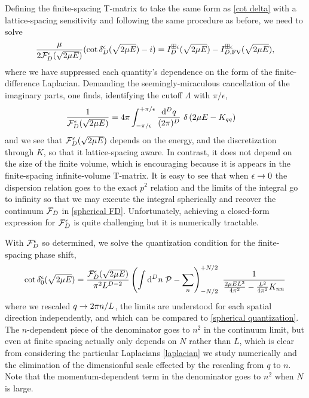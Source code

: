 Defining the finite-spacing T-matrix to take the same form as \eqref{cot delta} with a lattice-spacing sensitivity and following the same procedure as before, we need to solve
\begin{equation}
    \frac{\mu}{2\mathcal{F}_D^\epsilon(\sqrt{2 \mu E})}(\cot \delta_D^\epsilon(\sqrt{2 \mu E}) - i) = I_D^{\boxplus \epsilon}(\sqrt{2 \mu E}) - I_{D,\textrm{FV}}^{\boxplus \epsilon}(\sqrt{2 \mu E}),
\end{equation}
where we have suppressed each quantity's dependence on the form of the finite-difference Laplacian.
Demanding the seemingly-miraculous cancellation of the imaginary parts, one finds, identifying the cutoff $\Lambda$ with $\pi/\epsilon$,
\begin{align}
    \frac{1}{\mathcal{F}_D^\epsilon(\sqrt{2 \mu E})} &= 4\pi \int_{-\pi/\epsilon}^{+\pi/\epsilon} \frac{\mathrm{d}^D q}{(2\pi)^D}\
    \delta\left(2\mu E - K_{qq}\right)
\end{align}
and we see that $\mathcal{F}_D^\epsilon(\sqrt{2 \mu E})$ depends on the energy, and the discretization through $K$, so that it lattice-spacing aware.
In contrast, it does not depend on the size of the finite volume, which is encouraging because it is appears in the finite-spacing infinite-volume T-matrix.
It is easy to see that when $\epsilon\rightarrow0$ the dispersion relation goes to the exact $p^2$ relation and the limits of the integral go to infinity so that we may execute the integral spherically and recover the continuum $\mathcal{F}_D$ in \eqref{spherical FD}.
Unfortunately, achieving a closed-form expression for $\mathcal{F}_D^\epsilon$ is quite challenging but it is numerically tractable.

With $\mathcal{F}_D^\epsilon$ so determined, we solve the quantization condition for the finite-spacing phase shift,
\begin{align}
    \cot \delta_0^\epsilon(\sqrt{2 \mu E})
    =
    \frac{\mathcal{F}_D^\epsilon(\sqrt{2 \mu E})}{\pi^2 L^{D-2}}
    \left(\int \mathrm{d}^D n\; \mathcal{P} - \sum_n \right)_{-N/2}^{+N/2}\  \frac{1}{\frac{2\mu E L^2}{4\pi^2} - \frac{L^2}{4\pi^2} K_{nn}}
\end{align}
where we rescaled $q\rightarrow 2\pi n/L$, the limits are understood for each spatial direction independently, and which can be compared to \eqref{spherical quantization}.
The $n$-dependent piece of the denominator goes to $n^2$ in the continuum limit, but even at finite spacing actually only depends on $N$ rather than $L$, which is clear from considering the particular Laplacians \eqref{laplacian} we study numerically and the elimination of the dimensionful scale effected by the rescaling from $q$ to $n$.
Note that the momentum-dependent term in the denominator goes to $n^2$ when $N$ is large.

